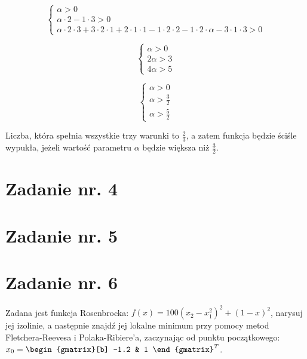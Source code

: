 \documentclass{article}
\begin{document}
\begin{equation}
  \begin{cases}
    \alpha > 0\\
    \alpha \cdot 2 - 1 \cdot 3 > 0\\
    \alpha \cdot 2 \cdot 3 + 3 \cdot 2 \cdot 1 + 2 \cdot 1 \cdot 1 - 1 \cdot 2 \cdot 2 - 
    1 \cdot 2 \cdot \alpha - 3 \cdot 1 \cdot 3 >0
  \end{cases}
\end{equation}

\begin{equation}
  \begin{cases}
    \alpha > 0\\
    2\alpha > 3\\
    4\alpha >5
  \end{cases}
\end{equation}

\begin{equation}
  \begin{cases}
    \alpha > 0\\
    \alpha > \frac{3}{2}\\
    \alpha >\frac{5}{2}
  \end{cases}
\end{equation}


Liczba, która spełnia wszystkie trzy warunki to $\frac{2}{3}$, a zatem funkcja będzie ściśle
wypukła, jeżeli wartość parametru $\alpha$ będzie większa niż $\frac{3}{2}$.

\section{Zadanie nr. 4}

\section{Zadanie nr. 5}

\section{Zadanie nr. 6}

Zadana jest funkcja Rosenbrocka: $f(x)=100(x_2-x_1^2)^2+(1-x)^2$, narysuj
jej izolinie, a następnie znajdź jej lokalne minimum przy pomocy metod Fletchera-Reevesa
i Polaka-Ribiere'a, zaczynając od punktu początkowego: $x_0=\begin{gmatrix}[b]
  -1.2 & 1
\end{gmatrix}^T$.\\
\end{document}
